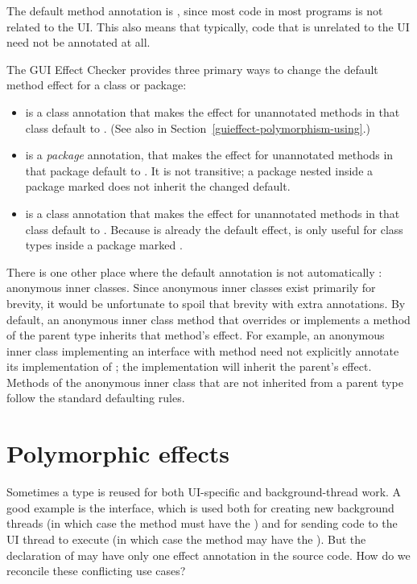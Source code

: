 The default method annotation is , since most code in most programs is not related
to the UI\@.  This also means that typically, code that is unrelated to the UI need not be annotated
at all.

The GUI Effect Checker provides three primary ways to change the default method effect for a class
or package:
\begin{itemize}
\item
  is a class annotation that makes the effect for unannotated methods in that
class default to
.  (See also  in Section~\ref{guieffect-polymorphism-using}.)
\item
  is a \emph{package} annotation, that makes the effect for unannotated
methods in that package default to .  It is not transitive; a package nested inside
a package marked  does not inherit the changed default.
\item
   is a class annotation that makes the effect for unannotated methods in that
class default to .  Because  is already the default
effect,  is only useful for class types inside a package marked .
\end{itemize}

There is one other place where the default annotation is not automatically :
anonymous inner classes.  Since anonymous inner classes exist primarily for brevity, it would be
unfortunate to spoil that brevity with extra annotations.  By default, an anonymous inner class
method that overrides or implements a method of the parent type inherits that method's effect.
For example, an anonymous inner class implementing an interface with method  need not explicitly annotate its implementation of ; the implementation will inherit
the parent's effect.  Methods of the anonymous inner class that are not inherited from a parent type
follow the standard defaulting rules.


\section{Polymorphic effects\label{guieffect-polymorphism}}

Sometimes a type is reused for both UI-specific and background-thread work.  A good example is the
 interface, which is used both for creating new background threads (in which case the
 method must have the ) and for sending code to the UI thread to
execute (in which case the  method may have the
).  But the declaration of
 may have only one effect annotation in the source code.
How do we reconcile these
conflicting use cases?

